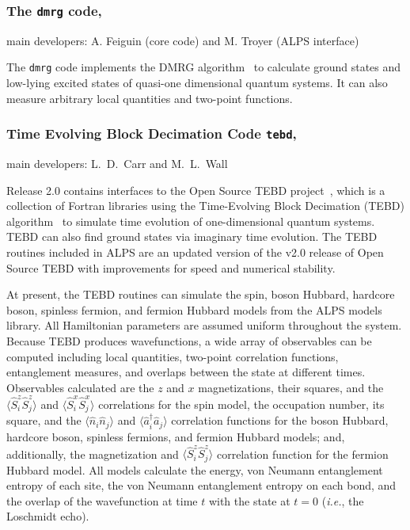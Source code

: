 \documentclass[12pt]{iopart}
\begin{document}
\subsubsection{The {\tt dmrg} code,} main developers: A. Feiguin (core code) and M. Troyer (ALPS interface)

\smallskip 

The {\tt dmrg} code implements the DMRG algorithm~\cite{White1992,Schollwock2005} to calculate ground states and low-lying excited states of quasi-one dimensional quantum systems. It can also measure arbitrary local quantities and two-point functions.

\subsubsection{Time Evolving Block Decimation Code {\tt tebd},} main developers: L.~D.~Carr and M.~L.~Wall

\smallskip

Release 2.0 contains interfaces to the Open Source TEBD project~\cite{ostebd}, which is a collection of Fortran libraries using the Time-Evolving Block Decimation (TEBD) algorithm~\cite{vidal1, vidal2} to simulate time evolution of one-dimensional quantum systems. TEBD can also find ground states via imaginary time evolution. The TEBD routines included in ALPS are an updated version of the v2.0 release of Open Source TEBD with improvements for speed and numerical stability.

At present, the TEBD routines can simulate the spin, boson Hubbard, hardcore boson, spinless fermion, and fermion Hubbard models from the ALPS models library. All 
Hamiltonian parameters are assumed uniform throughout the system. Because TEBD produces wavefunctions, a wide array of observables can be computed including local quantities, two-point correlation functions, entanglement measures, and overlaps between the state at different times. Observables calculated are the $z$ and $x$ magnetizations, their squares, and the $\langle \hat{S}^z_i 
\hat{S}^z_j\rangle$ and $\langle \hat{S}^x_i \hat{S}^x_j\rangle$ correlations for the spin model, the occupation number, its square, and the $\langle \hat{n}_i \hat{n}_j\rangle$ and 
$\langle \hat{a}_i^{\dagger} \hat{a}_j\rangle$ correlation functions for the boson Hubbard, hardcore boson, spinless fermions, and fermion Hubbard models; and, additionally, 
the magnetization and $\langle \hat{S}^z_i \hat{S}^z_j\rangle$ correlation function for the fermion Hubbard model. All models calculate the energy, von Neumann entanglement 
entropy of each site, the von Neumann entanglement entropy on each bond, and the overlap of the wavefunction at time $t$ with the state at $t=0$ ({\it i.e.}, the Loschmidt echo).
\end{document}
